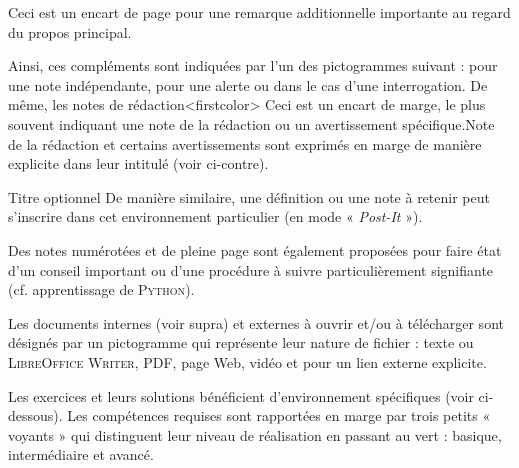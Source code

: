 \begin{remark}
Ceci est un encart de page pour une remarque additionnelle importante au regard du propos principal.
\end{remark}

Ainsi, ces compléments sont indiquées par l'un des pictogrammes suivant : \textcolor{firstcolor}{\faEye} pour une note indépendante, \textcolor{firstcolor}{\faExclamationTriangle} pour une alerte ou \textcolor{firstcolor}{\faQuestion} dans le cas d'une interrogation.
De même, les notes de rédaction\caution[t]<firstcolor>{%
Ceci est un encart de marge, le plus souvent indiquant une note de la rédaction ou un avertissement spécifique.}{Note de la rédaction}
 et certains avertissements sont exprimés en marge de manière explicite dans leur intitulé (voir ci-contre).

\begin{marker}{Titre optionnel}
De manière similaire, une définition ou une note à retenir peut s’inscrire dans cet environnement particulier (en mode « \textit{Post-It} »).
\end{marker}


\begin{linewidthnote}
Des notes numérotées et de pleine page sont également proposées pour faire état d'un conseil important ou d'une procédure à suivre particulièrement signifiante (cf. apprentissage de \textsc{Python}).
\end{linewidthnote}
\setcounter{linewidthnote}{0}

Les documents internes (voir supra) et externes à ouvrir et/ou à télécharger sont désignés par un pictogramme qui représente leur nature de fichier : \textcolor{secondcolor}{\faFileTextO} texte ou \textsc{LibreOffice} \textsc{Writer}, \textcolor{secondcolor}{\faFilePdfO} PDF, \textcolor{secondcolor}{\faFirefox} page Web, \textcolor{secondcolor}{\faVideoCamera} vidéo et \textcolor{secondcolor}{\faExternalLink} pour un lien externe explicite.

Les exercices et leurs solutions bénéficient d'environnement spécifiques (voir ci-dessous). Les compétences requises sont rapportées en marge par trois petits « voyants » qui distinguent leur niveau de réalisation en passant au vert : basique, intermédiaire et avancé. 

\begin{exercise*}[title={Exercice de style}, before skip=8pt, level=intermediate, points=2 points]
\lipsum[2]
\end{exercise*}

